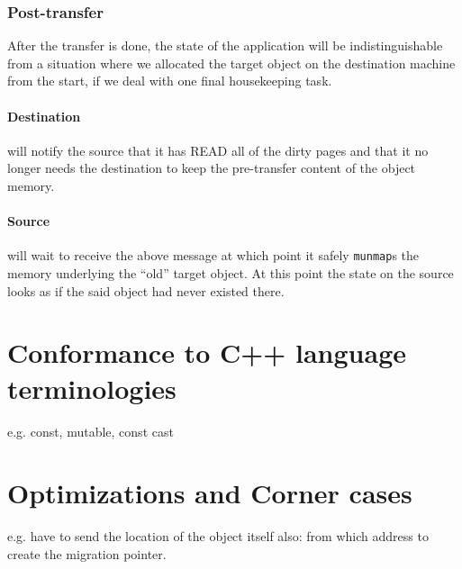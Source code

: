 \subsubsection{Post-transfer}
After the transfer is done, the state of the application will be
indistinguishable from a situation where we allocated the target object on
the destination machine from the start, if we deal with one final housekeeping
task.

\paragraph{Destination} will notify the source that it has READ all of the
dirty pages and that it no longer needs the destination to keep the
pre-transfer content of the object memory.

\paragraph{Source} will wait to receive the above message at which point it
safely \texttt{munmap}s the memory underlying the ``old'' target object. At
this point the state on the source looks as if the said object had never existed
there.


\section{Conformance to C++ language terminologies}
\label{sec:conform}
e.g. const, mutable, const cast


\section{Optimizations and Corner cases}
e.g. have to send the location of the object itself also: from
which address to create the migration pointer.


